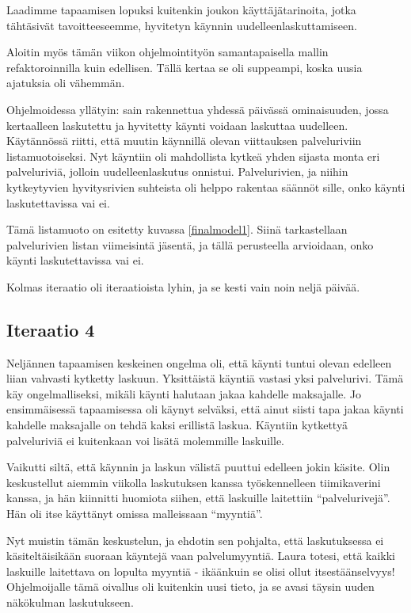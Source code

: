 Laadimme tapaamisen lopuksi kuitenkin joukon käyttäjätarinoita, jotka
tähtäsivät tavoitteeseemme, hyvitetyn käynnin uudelleenlaskuttamiseen.

Aloitin myös tämän viikon ohjelmointityön samantapaisella mallin
refaktoroinnilla kuin edellisen. Tällä kertaa se oli suppeampi, koska
uusia ajatuksia oli vähemmän.

Ohjelmoidessa yllätyin: sain rakennettua yhdessä päivässä ominaisuuden,
jossa kertaalleen laskutettu ja hyvitetty käynti voidaan laskuttaa
uudelleen. Käytännössä riitti, että muutin käynnillä olevan viittauksen
palveluriviin listamuotoiseksi. Nyt käyntiin oli mahdollista kytkeä
yhden sijasta monta eri palveluriviä, jolloin uudelleenlaskutus
onnistui. Palvelurivien, ja niihin kytkeytyvien hyvitysrivien suhteista
oli helppo rakentaa säännöt sille, onko käynti laskutettavissa vai ei.

Tämä listamuoto on esitetty kuvassa \ref{finalmodel1}. Siinä
tarkastellaan palvelurivien listan viimeisintä jäsentä, ja tällä
perusteella arvioidaan, onko käynti laskutettavissa vai ei.

Kolmas iteraatio oli iteraatioista lyhin, ja se kesti vain noin neljä
päivää.

\hypertarget{iteraatio-4}{%
\subsection{Iteraatio 4}\label{iteraatio-4}}

Neljännen tapaamisen keskeinen ongelma oli, että käynti tuntui olevan
edelleen liian vahvasti kytketty laskuun. Yksittäistä käyntiä vastasi
yksi palvelurivi. Tämä käy ongelmalliseksi, mikäli käynti halutaan jakaa
kahdelle maksajalle. Jo ensimmäisessä tapaamisessa oli käynyt selväksi,
että ainut siisti tapa jakaa käynti kahdelle maksajalle on tehdä kaksi
erillistä laskua. Käyntiin kytkettyä palveluriviä ei kuitenkaan voi
lisätä molemmille laskuille.

Vaikutti siltä, että käynnin ja laskun välistä puuttui edelleen jokin
käsite. Olin keskustellut aiemmin viikolla laskutuksen kanssa
työskennelleen tiimikaverini kanssa, ja hän kiinnitti huomiota siihen,
että laskuille laitettiin ``palvelurivejä''. Hän oli itse käyttänyt
omissa malleissaan ``myyntiä''.

Nyt muistin tämän keskustelun, ja ehdotin sen pohjalta, että
laskutuksessa ei käsiteltäisikään suoraan käyntejä vaan palvelumyyntiä.
Laura totesi, että kaikki laskuille laitettava on lopulta myyntiä -
ikäänkuin se olisi ollut itsestäänselvyys! Ohjelmoijalle tämä oivallus
oli kuitenkin uusi tieto, ja se avasi täysin uuden näkökulman
laskutukseen.

